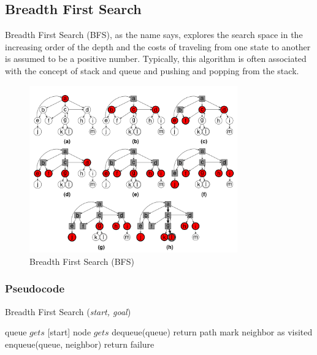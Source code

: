 \subsection{Breadth First Search}
\noindent Breadth First Search (BFS), as the name says, explores the search space in the increasing order of the depth and the costs of traveling from one state to another is assumed to be a positive number. Typically, this algorithm is often associated with the concept of stack and queue and pushing and popping from the stack.

\begin{figure}[H]
	\centering
	\includegraphics[width=0.8\textwidth]{./imgs/bfs.png}
	\caption{Breadth First Search (BFS)}
\end{figure}

\subsubsection{Pseudocode}
\begin{algorithm}[H]
	\caption{Breadth First Search (\textit{start, goal})}\label{alg:bfs}
	\begin{algorithmic}[1]
		\State queue \(gets\) [start]
		\State node \(gets\) dequeue(queue)
		\State return path
		\EndIf
		\State mark neighbor as visited
		\State enqueue(queue, neighbor)
		\EndIf
		\EndFor
		\EndWhile
		\State return failure
	\end{algorithmic}
\end{algorithm}

